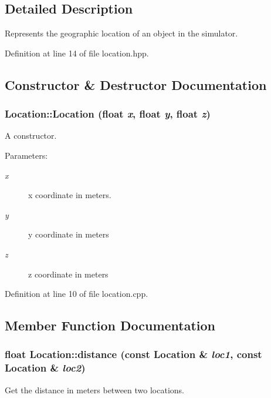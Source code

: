 \subsection{Detailed Description}
Represents the geographic location of an object in the simulator. 



Definition at line 14 of file location.hpp.

\subsection{Constructor \& Destructor Documentation}
\subsubsection{\setlength{\rightskip}{0pt plus 5cm}Location::Location (float {\em x}, float {\em y}, float {\em z})}\label{classLocation_6b4c565f8373e1c97eb2cb659166d628}


A constructor. 

\begin{Desc}
\item[Parameters:]
\begin{description}
\item[{\em x}]x coordinate in meters. \item[{\em y}]y coordinate in meters \item[{\em z}]z coordinate in meters \end{description}
\end{Desc}


Definition at line 10 of file location.cpp.

\subsection{Member Function Documentation}
\subsubsection{\setlength{\rightskip}{0pt plus 5cm}float Location::distance (const \bf{Location} \& {\em loc1}, const \bf{Location} \& {\em loc2})\hspace{0.3cm}{\tt  [inline, static]}}\label{classLocation_941604bbcd08a5807fe1d9e5e841636e}


Get the distance in meters between two locations. 

